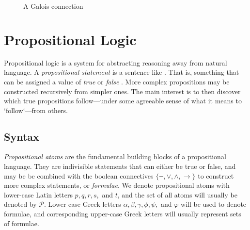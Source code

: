 \begin{figure}[H]
\caption{A Galois connection}
\end{figure}

\section{Propositional Logic}
\label{section:propositional-logic}

Propositional logic is a system for abstracting reasoning away from natural language. A \textit{propositional statement} is a sentence like . That is, something that can be assigned a value of \textit{true} or \textit{false} \cite[p. 7]{Ben1993Mathematical}. More complex propositions may be constructed recursively from simpler ones. The main interest is to then discover which true propositions follow---under some agreeable sense of what it means to `follow`---from others.

\subsection{Syntax}
\label{subsection:syntax}
       
\textit{Propositional atoms} are the fundamental building blocks of a propositional language. They are indivisible statements that can either be true or false, and may be be combined with the boolean connectives $\{\neg, \lor, \land, \rightarrow\}$ to construct more complex statements, or \textit{formulae}. We denote propositional atoms with lower-case Latin letters $p,q,r,s,$ and $t$, and the set of all atoms will usually be denoted by $\mathcal{P}$. Lower-case Greek letters $\alpha, \beta, \gamma, \phi, \psi,$ and $\varphi$ will be used to denote formulae, and corresponding upper-case Greek letters will usually represent sets of formulae.

